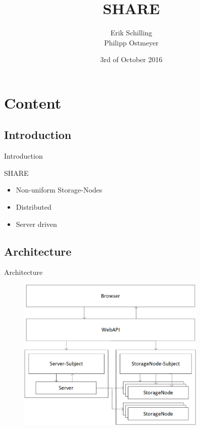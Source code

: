 \documentclass{beamer}
\title[SHARE]{SHARE}
\author{Erik Schilling\\Philipp	Ostmeyer}
\institute{Univertität Paderborn}
\date{3rd of October 2016}
\begin{document}
	
	\section{}
	\begin{frame}
		\titlepage
	\end{frame}
	
	\section{Content}
	\subsection{Introduction}
	\begin{frame}{Introduction}
		\begin{block}{SHARE}
			\begin{itemize}
				\item Non-uniform Storage-Nodes
				\item Distributed
				\item Server driven
			\end{itemize}
		\end{block}
	\end{frame}
	\subsection{Architecture}
	\begin{frame}{Architecture}
		\begin{figure}
			\hspace{0.1cm}
			\raggedright
			\begin{minipage}{1cm}
				\includegraphics[width=9cm]{architecture.png}
			\end{minipage}
		\end{figure}
	\end{frame}
\end{document}
